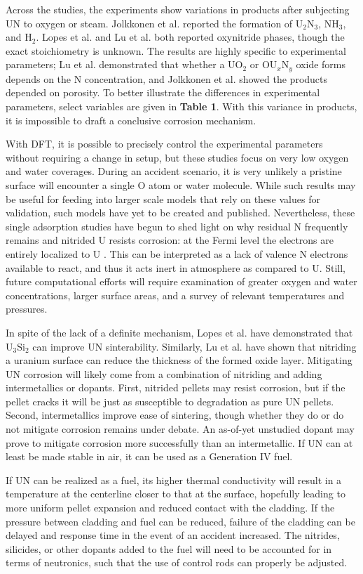 \documentclass[3p,review,11pt]{elsarticle}
\begin{document}
Across the studies, the experiments show variations in products after subjecting UN to oxygen or steam. Jolkkonen et al. reported the formation of U$_{2}$N$_{3}$, NH$_{3}$, and H$_{2}$. Lopes et al. and Lu et al. both reported oxynitride phases, though the exact stoichiometry is unknown. The results are highly specific to experimental parameters; Lu et al. demonstrated that whether a UO$_{2}$ or  OU$_{x}$N$_{y}$ oxide forms depends on the N concentration, and Jolkkonen et al. showed the products depended on porosity. To better illustrate the differences in experimental parameters, select variables are given in \textbf{Table 1}. With this variance in products, it is impossible to draft a conclusive corrosion mechanism.
\par With DFT, it is possible to precisely control the experimental parameters without requiring a change in setup, but these studies focus on very low oxygen and water coverages. During an accident scenario, it is very unlikely a pristine surface will encounter a single O atom or water molecule. While such results may be useful for feeding into larger scale models that rely on these values for validation,  such models have yet to be created and published. Nevertheless, these single adsorption studies have begun to shed light on why residual N frequently remains and nitrided U resists corrosion: at the Fermi level the electrons are entirely localized to U \cite{Bo2016}. This can be interpreted as a lack of valence N electrons available to react, and thus it acts inert in atmosphere as compared to U. Still, future computational efforts will require examination of greater oxygen and water concentrations, larger surface areas, and a survey of relevant temperatures and pressures. 
\par 
In spite of the lack of a definite mechanism, Lopes et al. \cite{Lopes2017} have demonstrated that U$_{3}$Si$_{2}$ can improve UN sinterability. Similarly, Lu et al. \cite{Lu2016} have shown that nitriding a uranium surface can reduce the thickness of the formed oxide layer.
Mitigating UN corrosion will likely come from a combination of nitriding and adding intermetallics or dopants. First, nitrided pellets may resist corrosion, but if the pellet cracks it will be just as susceptible to degradation as pure UN pellets. Second, intermetallics improve ease of sintering, though whether they do or do not mitigate corrosion remains under debate. An as-of-yet unstudied dopant may prove to mitigate corrosion more successfully than an intermetallic. If UN can at least be made stable in air, it can be used as a Generation IV fuel.
\par 
If UN can be realized as a fuel, its higher thermal conductivity will result in a temperature at the centerline closer to that at the surface, hopefully leading to more uniform pellet expansion and reduced contact with the cladding. If the pressure between cladding and fuel can be reduced, failure of the cladding can be delayed and response time in the event of an accident increased. The nitrides, silicides, or other dopants added to the fuel will need to be accounted for in terms of neutronics, such that the use of control rods can properly be adjusted.
\end{document}
